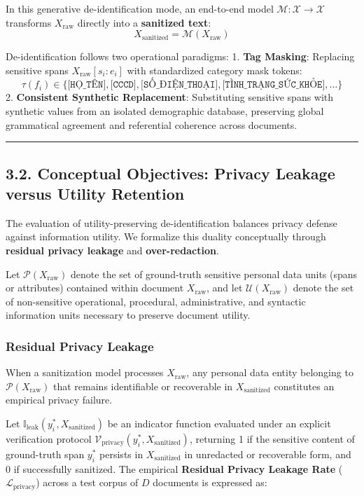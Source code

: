 \documentclass[
]{article}
\begin{document}
In this generative de-identification mode, an end-to-end model
\(\mathcal{M}: \mathcal{X} \to \mathcal{X}\) transforms
\(X_{\text{raw}}\) directly into a \textbf{sanitized text}:
\[X_{\text{sanitized}} = \mathcal{M}(X_{\text{raw}})\]

De-identification follows two operational paradigms: 1. \textbf{Tag
Masking}: Replacing sensitive spans \(X_{\text{raw}}[s_i:e_i]\) with
standardized category mask tokens:
\[\tau(f_i) \in \bigl\{\texttt{[HỌ\_TÊN]}, \texttt{[CCCD]}, \texttt{[SỐ\_ĐIỆN\_THOẠI]}, \texttt{[TÌNH\_TRẠNG\_SỨC\_KHỎE]}, \dots\bigr\}\]
2. \textbf{Consistent Synthetic Replacement}: Substituting sensitive
spans with synthetic values from an isolated demographic database,
preserving global grammatical agreement and referential coherence across
documents.

\begin{center}\rule{0.5\linewidth}{0.5pt}\end{center}

\subsection{3.2. Conceptual Objectives: Privacy Leakage versus Utility
Retention}\label{conceptual-objectives-privacy-leakage-versus-utility-retention}

The evaluation of utility-preserving de-identification balances privacy
defense against information utility. We formalize this duality
conceptually through \textbf{residual privacy leakage} and
\textbf{over-redaction}.

Let \(\mathcal{P}(X_{\text{raw}})\) denote the set of ground-truth
sensitive personal data units (spans or attributes) contained within
document \(X_{\text{raw}}\), and let \(\mathcal{U}(X_{\text{raw}})\)
denote the set of non-sensitive operational, procedural, administrative,
and syntactic information units necessary to preserve document utility.

\subsubsection{Residual Privacy Leakage}\label{residual-privacy-leakage}

When a sanitization model processes \(X_{\text{raw}}\), any personal
data entity belonging to \(\mathcal{P}(X_{\text{raw}})\) that remains
identifiable or recoverable in \(X_{\text{sanitized}}\) constitutes an
empirical privacy failure.

Let \(\mathbb{I}_{\text{leak}}(y_i^*, X_{\text{sanitized}})\) be an
indicator function evaluated under an explicit verification protocol
\(\mathcal{V}_{\text{privacy}}(y_i^*, X_{\text{sanitized}})\), returning
1 if the sensitive content of ground-truth span \(y_i^*\) persists in
\(X_{\text{sanitized}}\) in unredacted or recoverable form, and 0 if
successfully sanitized. The empirical \textbf{Residual Privacy Leakage
Rate} (\(\mathcal{L}_{\text{privacy}}\)) across a test corpus of \(D\)
documents is expressed as:
\end{document}
